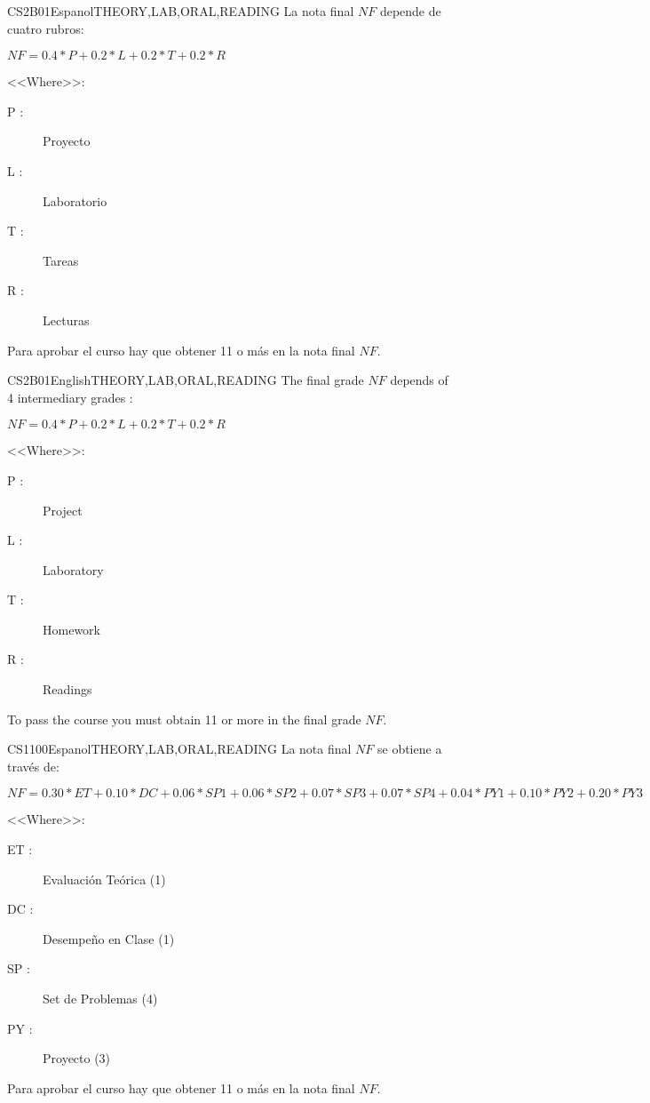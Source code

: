 \begin{evaluation}{CS2B01}{Espanol}{THEORY,LAB,ORAL,READING}
La nota final $NF$ depende de cuatro rubros:

  $ NF = 0.4*P + 0.2*L + 0.2*T + 0.2*R $

<<Where>>:
  \begin{description}
		\item[P :] Proyecto
		\item[L :] Laboratorio
    \item[T :] Tareas
    \item[R :] Lecturas
	\end{description}

	Para aprobar el curso hay que obtener 11 o más en la nota final $NF$.
\end{evaluation}

\begin{evaluation}{CS2B01}{English}{THEORY,LAB,ORAL,READING}
The final grade $NF$ depends of 4 intermediary grades :

  $ NF = 0.4*P + 0.2*L + 0.2*T + 0.2*R $

<<Where>>:
\begin{description}
	\item[P :] Project
	\item[L :] Laboratory
	\item[T :] Homework
	\item[R :] Readings
	\end{description}

	To pass the course you must obtain 11 or more in the final grade $NF$.
\end{evaluation}


\begin{evaluation}{CS1100}{Espanol}{THEORY,LAB,ORAL,READING}
La nota final $NF$ se obtiene a través de:

  $ NF = 0.30*ET + 0.10*DC + 0.06*SP1 + 0.06*SP2 + 0.07*SP3 + 0.07*SP4 +0.04*PY1
   + 0.10*PY2 + 0.20*PY3 $

<<Where>>:
  \begin{description}
		\item[ET :] Evaluación Teórica (1)
		\item[DC :] Desempeño en Clase (1)
    \item[SP :] Set de Problemas (4)
    \item[PY :] Proyecto (3)
	\end{description}

	Para aprobar el curso hay que obtener 11 o más en la nota final $NF$.
\end{evaluation}

